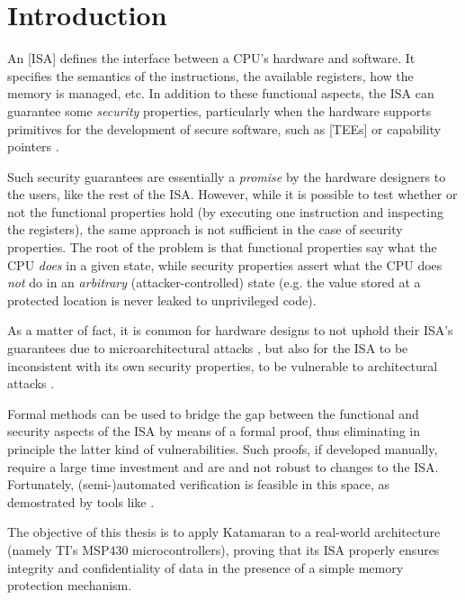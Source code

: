 \chapter{Introduction}

An [ISA] \cite{ArmISA} defines the interface between a CPU's hardware and software. It specifies the semantics of the instructions, the available registers, how the memory is managed, etc. In addition to these functional aspects, the ISA can guarantee some \emph{security} properties, particularly when the hardware supports primitives for the development of secure software, such as [TEEs]  or capability pointers \todocite{}.

Such security guarantees are essentially a \emph{promise} by the hardware designers to the users, like the rest of the ISA. However, while it is possible to test whether or not the functional properties hold (\eg by executing one instruction and inspecting the registers), the same approach is not sufficient in the case of security properties. The root of the problem is that functional properties say what the CPU \emph{does} in a given state, while security properties assert what the CPU does \emph{not} do in an \emph{arbitrary} (attacker-controlled) state (e.g. the value stored at a protected location is never leaked to unprivileged code).

As a matter of fact, it is common for hardware designs to not uphold their ISA's guarantees due to microarchitectural attacks  \cite{Bognar2024}, but also for the ISA to be inconsistent with its own security properties, \ie to be vulnerable to architectural attacks \cite{Bognar2024}.

Formal methods can be used to bridge the gap between the functional and security aspects of the ISA by means of a formal proof, thus eliminating in principle the latter kind of vulnerabilities. Such proofs, if developed manually, require a large time investment and are and not robust to changes to the ISA. Fortunately, (semi-)automated verification is feasible in this space, as demostrated by tools like  \todocite{}.

The objective of this thesis is to apply Katamaran to a real-world architecture (namely TI's MSP430 microcontrollers), proving that its ISA properly ensures integrity and confidentiality of data in the presence of a simple memory protection mechanism.

